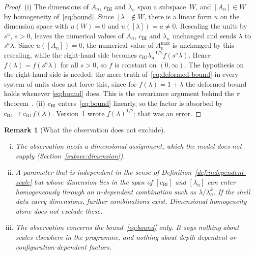 \documentclass[11pt,a4paper]{article}
\newtheorem{remark}[theorem]{Remark}
\begin{document}
    \begin{proof}
      (i) The dimensions of $A_n$, $c_{\mathrm{BI}}$ and $\lambda_n$ span a subspace~$W$, and $[A_n]\in W$ by
      homogeneity of~\eqref{eq:bound}.
      Since $[\lambda]\notin W$, there is a linear form $u$ on the dimension space with $u(W)=0$ and
      $u([\lambda])=a\neq 0$.
      Rescaling the units by $s^{u}$, $s>0$, leaves the numerical values of $A_n$, $c_{\mathrm{BI}}$ and
      $\lambda_n$ unchanged and sends $\lambda$ to $s^{a}\lambda$.
      Since $u([A_n])=0$, the numerical value of $A_n^{\max}$ is unchanged by this rescaling, while the
      right-hand side becomes $c_{\mathrm{BI}}\lambda_n^{-1/2}f(s^{a}\lambda)$.
      Hence $f(\lambda)=f(s^{a}\lambda)$ for all $s>0$, so $f$ is constant on $(0,\infty)$.
      The hypothesis on the right-hand side is needed: the mere truth of~\eqref{eq:deformed-bound} in every
      system of units does not force this, since for $f(\lambda)=1+\lambda$ the deformed bound holds whenever
      \eqref{eq:bound} does.
      This is the covariance argument behind the $\pi$ theorem~\cite{Buckingham1914,Bridgman1922}.
      (ii) $c_{\mathrm{BI}}$ enters~\eqref{eq:bound} linearly, so the factor is absorbed by
      $c_{\mathrm{BI}}\mapsto c_{\mathrm{BI}}\,f(\lambda)$.
      Version~1 wrote $f(\lambda)^{1/2}$; that was an error.
    \end{proof}

    \begin{remark}[What the observation does not exclude]
      \label{rem:homogeneity-limits}
      \begin{enumerate}[(i)]
        \item The observation needs a dimensional assignment, which the model does not supply
          (Section~\ref{subsec:dimension}).
        \item A parameter that is independent in the sense of Definition~\ref{def:independent-scale} but whose
          dimension lies in the span of $[c_{\mathrm{BI}}]$ and $[\lambda_n]$ can enter homogeneously through an
          $n$-dependent combination such as $\lambda/\lambda_n^{k}$.
          If the shell data carry dimensions, further combinations exist.
          Dimensional homogeneity alone does not exclude these.
        \item The observation concerns the bound~\eqref{eq:bound} only.
          It says nothing about scales elsewhere in the programme, and nothing about depth-dependent or
          configuration-dependent factors.
      \end{enumerate}
    \end{remark}
\end{document}
